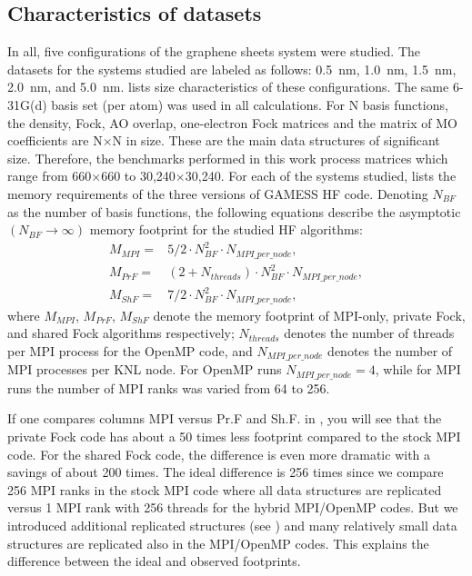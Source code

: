 \subsection{Characteristics of datasets}
\label{ssec:datasets}
In all, five configurations of the graphene sheets system were studied. The datasets for the systems studied are labeled as follows: 0.5~nm, 1.0~nm, 1.5~nm, 2.0~nm, and 5.0~nm.   lists size characteristics of these configurations. The same 6-31G(d) basis set (per atom) was used in all calculations. For N basis functions, the density, Fock, AO overlap, one-electron Fock matrices and the matrix of MO coefficients are N$\times$N in size. These are the main data structures of significant size. Therefore, the benchmarks performed in this work process matrices which range from 660$\times$660 to 30,240$\times$30,240. For each of the systems studied,  lists the memory requirements of the three versions of GAMESS HF code.
Denoting $N_{BF}$ as the number of basis functions, the following equations describe the asymptotic $(N_{BF}\to\infty)$ memory footprint for the studied HF algorithms:
\begin{subequations}
	\label{eqn:mem}
	\begin{align}
		M_{MPI} =& 5/2 \cdot N_{BF}^2 \cdot N_{MPI\_per\_node}, 				\label{eqn:mem:mpi} \\
		M_{PrF} =& (2+N_{threads}) \cdot N_{BF}^2 \cdot N_{MPI\_per\_node}, 	\label{eqn:mem:prv} \\
		M_{ShF} =& 7/2 \cdot N_{BF}^2 \cdot N_{MPI\_per\_node},					\label{eqn:mem:shr}
	\end{align}
\end{subequations}
where $M_{MPI}$, $M_{PrF}$, $M_{ShF}$ denote the memory footprint of MPI-only, private Fock, and shared Fock algorithms respectively; $N_{threads}$ denotes the number of threads per MPI process for the OpenMP code, and $N_{MPI\_per\_node}$ denotes the number of MPI processes per KNL node. For OpenMP runs $N_{MPI\_per\_node}=4$, while for MPI runs the number of MPI ranks was varied from 64 to 256.

If one compares columns MPI versus Pr.F and Sh.F. in , you will see that the private Fock code has about a 50 times less footprint compared to the stock MPI code. For the shared Fock code, the difference is even more dramatic with a savings of about 200 times. The ideal difference is 256 times since we compare 256 MPI ranks in the stock MPI code where all data structures are replicated versus 1 MPI rank with 256 threads for the hybrid MPI/OpenMP codes. But we introduced additional replicated structures (see ) and many relatively small data structures are replicated also in the MPI/OpenMP codes. This explains the difference between the ideal and observed footprints.

